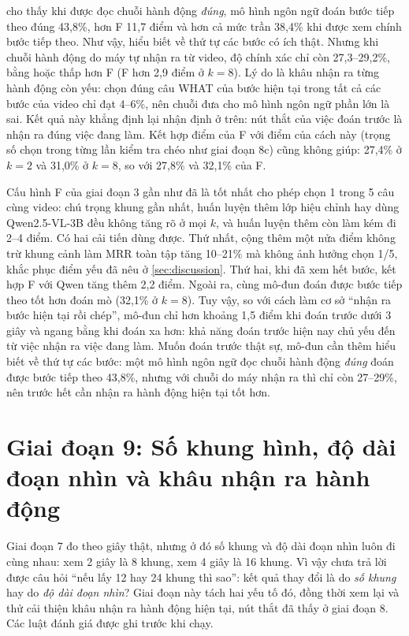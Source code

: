 \documentclass[a4paper,oneside]{report}
\begin{document}
 cho thấy khi được đọc chuỗi hành động \textit{đúng}, mô hình ngôn ngữ đoán bước tiếp theo đúng 43,8\%, hơn F 11,7 điểm và hơn cả mức trần 38,4\% khi được xem chính bước tiếp theo. Như vậy, hiểu biết về thứ tự các bước có ích thật. Nhưng khi chuỗi hành động do máy tự nhận ra từ video, độ chính xác chỉ còn 27,3--29,2\%, bằng hoặc thấp hơn F (F hơn 2,9 điểm ở $k=8$). Lý do là khâu nhận ra từng hành động còn yếu: chọn đúng câu WHAT của bước hiện tại trong tất cả các bước của video chỉ đạt 4--6\%, nên chuỗi đưa cho mô hình ngôn ngữ phần lớn là sai. Kết quả này khẳng định lại nhận định ở trên: nút thắt của việc đoán trước là nhận ra đúng việc đang làm. Kết hợp điểm của F với điểm của cách này (trọng số chọn trong từng lần kiểm tra chéo như giai đoạn 8c) cũng không giúp: 27,4\% ở $k=2$ và 31,0\% ở $k=8$, so với 27,8\% và 32,1\% của F.

\begin{ketqua}
Cấu hình F của giai đoạn 3 gần như đã là tốt nhất cho phép chọn 1 trong 5 câu cùng video: chú trọng khung gần nhất, huấn luyện thêm lớp hiệu chỉnh hay dùng Qwen2.5-VL-3B đều không tăng rõ ở mọi $k$, và huấn luyện thêm còn làm kém đi 2--4 điểm. Có hai cải tiến dùng được. Thứ nhất, cộng thêm một nửa điểm không trừ khung cảnh làm MRR toàn tập tăng 10--21\% mà không ảnh hưởng chọn 1/5, khắc phục điểm yếu đã nêu ở \cref{sec:discussion}. Thứ hai, khi đã xem hết bước, kết hợp F với Qwen tăng thêm 2,2 điểm. Ngoài ra, cùng mô-đun đoán được bước tiếp theo tốt hơn đoán mò (32,1\% ở $k=8$). Tuy vậy, so với cách làm cơ sở ``nhận ra bước hiện tại rồi chép'', mô-đun chỉ hơn khoảng 1,5 điểm khi đoán trước dưới 3 giây và ngang bằng khi đoán xa hơn: khả năng đoán trước hiện nay chủ yếu đến từ việc nhận ra việc đang làm. Muốn đoán trước thật sự, mô-đun cần thêm hiểu biết về thứ tự các bước: một mô hình ngôn ngữ đọc chuỗi hành động \textit{đúng} đoán được bước tiếp theo 43,8\%, nhưng với chuỗi do máy nhận ra thì chỉ còn 27--29\%, nên trước hết cần nhận ra hành động hiện tại tốt hơn.
\end{ketqua}

\section{Giai đoạn 9: Số khung hình, độ dài đoạn nhìn và khâu nhận ra hành động}
\label{sec:stage9}

Giai đoạn 7 đo theo giây thật, nhưng ở đó số khung và độ dài đoạn nhìn luôn đi cùng nhau: xem 2 giây là 8 khung, xem 4 giây là 16 khung. Vì vậy chưa trả lời được câu hỏi ``nếu lấy 12 hay 24 khung thì sao'': kết quả thay đổi là do \textit{số khung} hay do \textit{độ dài đoạn nhìn}? Giai đoạn này tách hai yếu tố đó, đồng thời xem lại và thử cải thiện khâu nhận ra hành động hiện tại, nút thắt đã thấy ở giai đoạn 8. Các luật đánh giá được ghi trước khi chạy.
\end{document}
